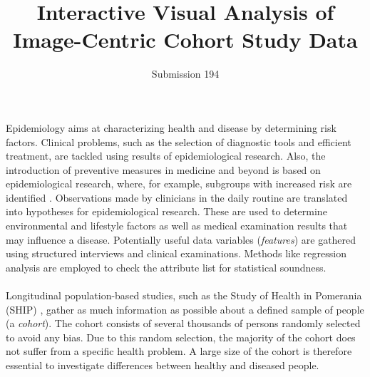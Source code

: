 \documentclass[journal]{style/vgtc} 			          %
\title{Interactive Visual Analysis of Image-Centric Cohort Study Data}
\author{Submission 194}
\begin{document}


\maketitle

Epidemiology aims at characterizing health and disease by determining risk factors.
%
Clinical problems, such as the selection of diagnostic tools and efficient treatment, are tackled using results of epidemiological research.
%
Also, the introduction of preventive measures in medicine and beyond is based on epidemiological research, where, for example, subgroups with increased risk are identified \cite{Fletcher2012}.
%
Observations made by clinicians in the daily routine are translated into hypotheses for epidemiological research.
%
These are used to determine environmental and lifestyle factors as well as medical examination results that may influence a disease.
%
Potentially useful data variables (\emph{features}) are gathered using structured interviews and clinical examinations.
%
Methods like regression analysis are employed to check the attribute list for statistical soundness.
%
\\\\
Longitudinal population-based studies, such as the Study of Health in Pomerania (SHIP) \cite{Volzke2011}, gather as much information as possible about a defined sample of people (a \emph{cohort}).
%
The cohort consists of several thousands of persons randomly selected to avoid any bias.
%
Due to this random selection, the majority of the cohort does not suffer from a specific health problem.
%
A large size of the cohort is therefore essential to investigate differences between healthy and diseased people.
%
\end{document}
